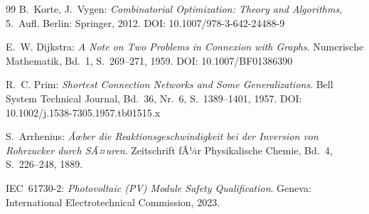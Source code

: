 ﻿\documentclass[a4paper,12pt]{article}
\theoremstyle{definition}
\theoremstyle{remark}
\begin{document}
\begin{thebibliography}{99}
B.~Korte, J.~Vygen:
\textit{Combinatorial Optimization: Theory and Algorithms}, 5.~Aufl.
Berlin: Springer, 2012.
DOI: 10.1007/978-3-642-24488-9

E.~W. Dijkstra:
\textit{A Note on Two Problems in Connexion with Graphs}.
Numerische Mathematik, Bd.~1, S.~269--271, 1959.
DOI: 10.1007/BF01386390

R.~C. Prim:
\textit{Shortest Connection Networks and Some Generalizations}.
Bell System Technical Journal, Bd.~36, Nr.~6, S.~1389--1401, 1957.
DOI: 10.1002/j.1538-7305.1957.tb01515.x

S.~Arrhenius:
\textit{Ãœber die Reaktionsgeschwindigkeit bei der Inversion von Rohrzucker
durch SÃ¤uren}.
Zeitschrift fÃ¼r Physikalische Chemie, Bd.~4, S.~226--248, 1889.

IEC~61730-2:
\textit{Photovoltaic (PV) Module Safety Qualification}.
Geneva: International Electrotechnical Commission, 2023.

\end{thebibliography}
\end{document}
